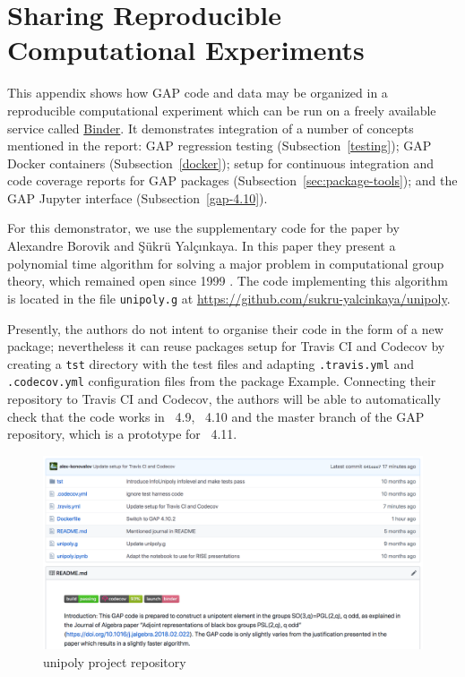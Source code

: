 \section{Sharing Reproducible Computational Experiments}\label{sec:repro-gap}

This appendix shows how GAP code and data may be organized
in a reproducible computational experiment which can be run
on a freely available service called \href{https://mybinder.org/}{Binder}.
It demonstrates integration of a number of concepts mentioned
in the report: 
GAP regression testing (Subsection~\ref{testing});
GAP Docker containers (Subsection~\ref{docker});
setup for continuous integration and code coverage reports
for GAP packages (Subsection~\ref{sec:package-tools}); 
and the GAP Jupyter interface (Subsection~\ref{gap-4.10}).

For this demonstrator, we use the supplementary code for the 
paper \cite{black-box} by
Alexandre Borovik and \c{S}\"{u}kr\"{u} Yal\c{c}{\i}nkaya.
In this paper they present a polynomial time algorithm for 
solving a major problem in computational group theory, 
which remained open since 1999 \cite{babai-beals}. 
The code implementing this algorithm is located in the file
{\tt unipoly.g} at \url{https://github.com/sukru-yalcinkaya/unipoly}.

Presently, the authors do not intent to organise their code
in the form of a new \GAP package; nevertheless 
it can reuse packages setup for Travis CI and Codecov by 
creating a {\tt tst} directory with the test files and adapting
{\tt .travis.yml} and {\tt .codecov.yml} configuration files
from the \GAP package {\sf Example}. Connecting their repository
to Travis CI and Codecov, the authors will be able to automatically 
check that the code works in \GAP~4.9, \GAP~4.10 and 
the master branch of the GAP repository, which is a prototype for
\GAP~4.11.

\begin{figure}[!ht]
    \centering
    \includegraphics[width=\textwidth]{images/unipoly-repo}
    \caption{unipoly project repository}
    \label{fig:unipoly-repo}
\end{figure}

